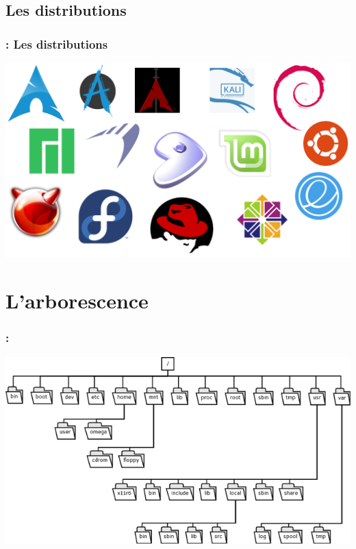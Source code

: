 \documentclass[13pt]{beamer}
\newenvironment{slide}[1]{
  \begin{frame}[environment=slide]
    \frametitle{\textbf{\insertsection}  : #1}}
{\end{frame}}
\begin{document}
\subsection{Les distributions}

\begin{slide}{Les distributions}
  \begin{center}
    \includegraphics[scale=0.5]{Images/distro_mosaic.png}
  \end{center}
\end{slide}

\section{L'arborescence}

\begin{slide}{}
  \begin{center}
    \includegraphics[scale=0.3]{Images/arborescence.png}
  \end{center}
\end{slide}
\end{document}
